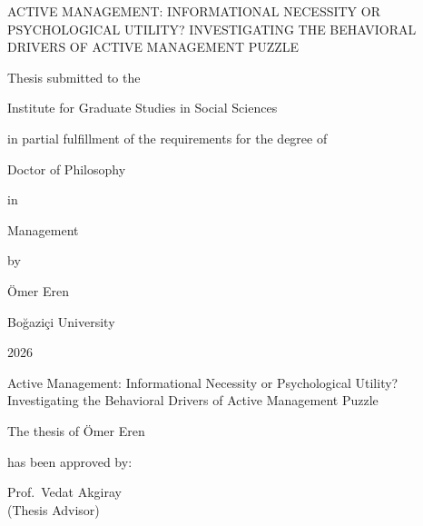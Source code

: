 \documentclass[12pt, oneside]{report}
\begin{document}
\begin{titlepage}
\thispagestyle{empty}
\begin{center}

\vspace*{1.2in}

ACTIVE MANAGEMENT: INFORMATIONAL NECESSITY OR PSYCHOLOGICAL UTILITY?
INVESTIGATING THE BEHAVIORAL DRIVERS OF ACTIVE MANAGEMENT PUZZLE

\vspace{0.5in}

Thesis submitted to the

Institute for Graduate Studies in Social Sciences

in partial fulfillment of the requirements for the degree of

\vspace{0.5in}

Doctor of Philosophy

in

Management

\vspace{0.5in}

by

Ömer Eren

\vspace{0.5in}

Boğaziçi University

2026

\end{center}
\end{titlepage}

\setcounter{page}{2}
\thispagestyle{empty}

\vspace*{0.55in}

\begin{center}
Active Management: Informational Necessity or Psychological Utility?\\
Investigating the Behavioral Drivers of Active Management Puzzle

\vspace{0.5in}

The thesis of Ömer Eren

has been approved by:

\vspace{0.5in}
\end{center}

\begin{singlespace}
\noindent Prof.\ Vedat Akgiray \hfill \underline{\hspace{3in}}\\
\noindent (Thesis Advisor)
\end{singlespace}
\end{document}
